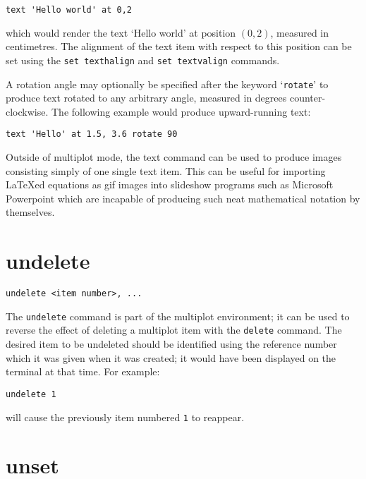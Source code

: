 \documentclass[a4paper,onecolumn,11pt]{book}
\begin{document}
\begin{verbatim}
text 'Hello world' at 0,2
\end{verbatim}

\noindent which would render the text `Hello world' at position $(0,2)$,
measured in centimetres. The alignment of the text item with respect to this
position can be set using the {\tt set texthalign} and {\tt set textvalign}
commands.

A rotation angle may optionally be specified after the keyword `{\tt rotate}'
to produce text rotated to any arbitrary angle, measured in degrees
counter-clockwise. The following example would produce upward-running text:

\begin{verbatim}
text 'Hello' at 1.5, 3.6 rotate 90
\end{verbatim}

Outside of multiplot mode, the text command can be used to produce images
consisting simply of one single text item. This can be useful for importing
\LaTeX ed equations as gif images into slideshow programs such as Microsoft
Powerpoint which are incapable of producing such neat mathematical notation
by themselves.

\section{undelete}

\begin{verbatim}
undelete <item number>, ...
\end{verbatim}

The {\tt undelete} command is part of the multiplot environment; it can be used
to reverse the effect of deleting a multiplot item with the {\tt delete}
command. The desired item to be undeleted should be identified using the
reference number which it was given when it was created; it would have been
displayed on the terminal at that time. For example:

\begin{verbatim}
undelete 1
\end{verbatim}

\noindent will cause the previously item numbered {\tt 1} to reappear.
  
\section{unset}
\end{document}
